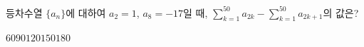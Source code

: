 \hspace*{2mm}\begin{minipage}[t]{\dimexpr\linewidth-2mm\relax}\vspace{0pt}
등차수열 $\{a_n\}$에 대하여 $a_2=1$, $a_8=-17$일 때, $\displaystyle\sum_{k=1}^{50}a_{2k}-\sum_{k=1}^{50}a_{2k+1}$의 값은?
\begin{choices32}{$60$}{$90$}{$120$}{$150$}{$180$}\end{choices32}\end{minipage}
